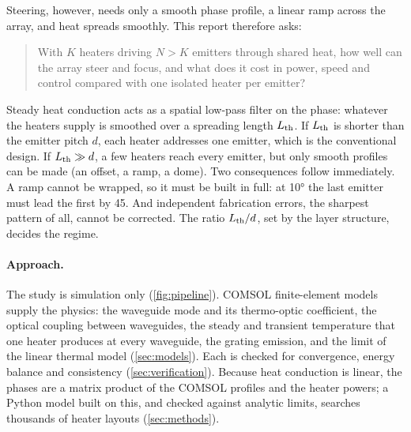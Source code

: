Steering, however, needs only a smooth phase profile, a linear ramp across the array, and heat spreads smoothly.
This report therefore asks:
\begin{quote}
  With $K$ heaters driving $N>K$ emitters through shared heat, how well can the array steer and focus, and what
  does it cost in power, speed and control compared with one isolated heater per emitter?
\end{quote}

Steady heat conduction acts as a spatial low-pass filter on the phase: whatever the heaters supply is smoothed
over a spreading length $L_{\mathrm{th}}$. If $L_{\mathrm{th}}$ is shorter than the emitter pitch $d$, each heater addresses one emitter,
which is the conventional design. If $L_{\mathrm{th}}\gg d$, a few heaters reach every emitter, but only smooth profiles can
be made (an offset, a ramp, a dome). Two consequences follow immediately. A ramp cannot be wrapped, so it must be
built in full: at \ang{10} the last emitter must lead the first by \qty{45}{\rad}. And independent fabrication
errors, the sharpest pattern of all, cannot be corrected. The ratio $L_{\mathrm{th}}/d$, set by the layer structure, decides
the regime.

\paragraph{Approach.} The study is simulation only (\cref{fig:pipeline}). COMSOL finite-element models supply the
physics: the waveguide mode and its thermo-optic coefficient, the optical coupling between waveguides, the
steady and transient temperature that one heater produces at every waveguide, the grating emission, and the limit
of the linear thermal model (\cref{sec:models}). Each is checked for convergence, energy balance and consistency
(\cref{sec:verification}). Because heat conduction is linear, the phases are a matrix product of the COMSOL
profiles and the heater powers; a Python model built on this, and checked against analytic limits, searches
thousands of heater layouts (\cref{sec:methods}).

